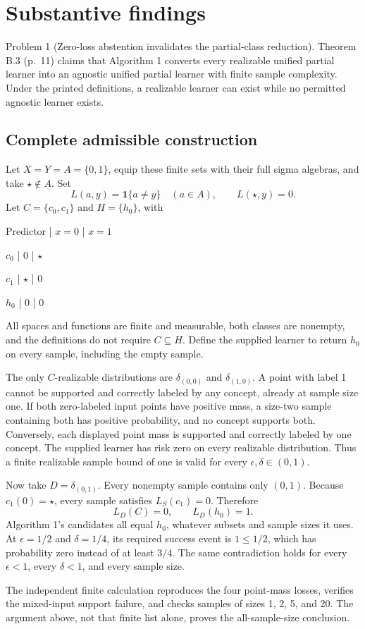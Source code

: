 \documentclass[10pt]{article}
\begin{document}
\section*{Substantive findings}
Problem 1 (Zero-loss abstention invalidates the partial-class reduction).  Theorem B.3 (p. 11) claims that Algorithm 1 converts every realizable unified partial learner into an agnostic unified partial learner with finite sample complexity. Under the printed definitions, a realizable learner can exist while no permitted agnostic learner exists.\par
\subsection*{Complete admissible construction}
Let \(X=Y=A=\{0,1\}\), equip these finite sets with their full sigma algebras, and take \(\star\notin A\). Set \[L(a,y)=\mathbf1\{a\ne y\}\quad(a\in A),\qquad L(\star,y)=0.\] Let \(C=\{c_0,c_1\}\) and \(H=\{h_0\}\), with\par
Predictor | \(x=0\) | \(x=1\)\par
\(c_0\) | \(0\) | \(\star\)\par
\(c_1\) | \(\star\) | \(0\)\par
\(h_0\) | \(0\) | \(0\)\par
All spaces and functions are finite and measurable, both classes are nonempty, and the definitions do not require \(C\subseteq H\). Define the supplied learner to return \(h_0\) on every sample, including the empty sample.\par
The only \(C\)-realizable distributions are \(\delta_{(0,0)}\) and \(\delta_{(1,0)}\). A point with label 1 cannot be supported and correctly labeled by any concept, already at sample size one. If both zero-labeled input points have positive mass, a size-two sample containing both has positive probability, and no concept supports both. Conversely, each displayed point mass is supported and correctly labeled by one concept. The supplied learner has risk zero on every realizable distribution. Thus a finite realizable sample bound of one is valid for every \(\epsilon,\delta\in(0,1)\).\par
Now take \(D=\delta_{(0,1)}\). Every nonempty sample contains only \((0,1)\). Because \(c_1(0)=\star\), every sample satisfies \(L_S(c_1)=0\). Therefore \[L_D(C)=0,\qquad L_D(h_0)=1.\] Algorithm 1’s candidates all equal \(h_0\), whatever subsets and sample sizes it uses. At \(\epsilon=1/2\) and \(\delta=1/4\), its required success event is \(1\le1/2\), which has probability zero instead of at least \(3/4\). The same contradiction holds for every \(\epsilon<1\), every \(\delta<1\), and every sample size.\par
The independent finite calculation reproduces the four point-mass losses, verifies the mixed-input support failure, and checks samples of sizes 1, 2, 5, and 20. The argument above, not that finite list alone, proves the all-sample-size conclusion.\par
\end{document}
